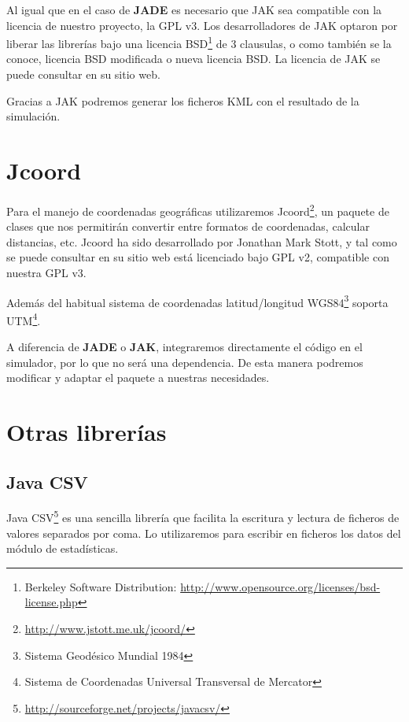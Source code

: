 
Al igual que en el caso de {\bf JADE} es necesario que JAK sea compatible con
la licencia de nuestro proyecto, la GPL v3. %
Los desarrolladores de JAK optaron por liberar las librerías bajo una licencia
BSD\footnote{Berkeley Software Distribution:
\url{http://www.opensource.org/licenses/bsd-license.php}} de 3 clausulas, o como
también se la conoce, licencia BSD modificada o nueva licencia BSD. La licencia
de JAK se puede consultar en su sitio web.

Gracias a JAK podremos generar los ficheros KML con el resultado de la
simulación.

\section*{Jcoord}

Para el manejo de coordenadas geográficas utilizaremos
Jcoord\footnote{\url{http://www.jstott.me.uk/jcoord/}}, un paquete de clases que
nos permitirán convertir entre formatos de coordenadas, calcular distancias,
etc. Jcoord ha sido desarrollado por Jonathan Mark Stott, y tal como se puede
consultar en su sitio web está licenciado bajo GPL v2, compatible con nuestra
GPL v3. %

Además del habitual sistema de coordenadas latitud/longitud
WGS84\footnote{Sistema Geodésico Mundial 1984} soporta UTM\footnote{Sistema de
Coordenadas Universal Transversal de Mercator}.

A diferencia de {\bf JADE} o {\bf JAK}, integraremos directamente el código en
el simulador, por lo que no será una dependencia. De esta manera podremos
modificar y adaptar el paquete a nuestras necesidades.

\section*{Otras librerías}

\subsection*{Java CSV}

Java CSV\footnote{\url{http://sourceforge.net/projects/javacsv/}} es una
sencilla librería que facilita la escritura y lectura de ficheros de valores
separados por coma. Lo utilizaremos para escribir en ficheros los datos del
módulo de estadísticas.

